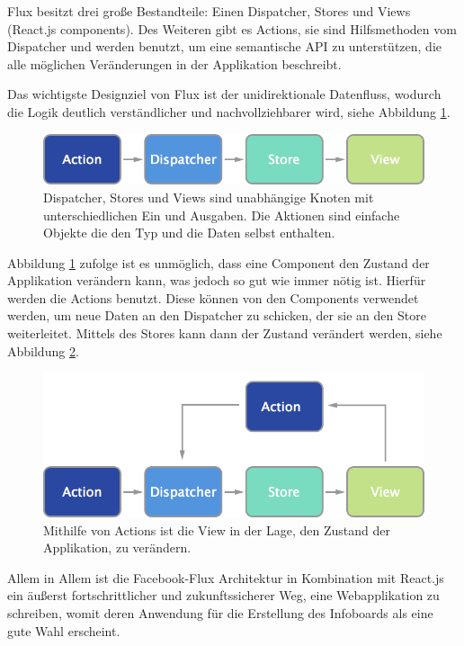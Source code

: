 \documentclass[12pt,twoside]{book}
\begin{document}
Flux besitzt drei große Bestandteile: Einen Dispatcher, Stores und Views (React.js components). Des Weiteren gibt es Actions, sie sind Hilfsmethoden vom Dispatcher und werden benutzt, um eine semantische API zu unterstützen, die alle möglichen Veränderungen in der Applikation beschreibt.

Das wichtigste Designziel von Flux ist der unidirektionale Datenfluss, wodurch die Logik deutlich verständlicher und nachvollziehbarer wird, siehe Abbildung \ref{fig:flux}.

\begin{figure}[htbp]
    \centering
    \includegraphics[width=1.0\textwidth]{images/flux.png}
    \caption{Dispatcher, Stores und Views sind unabhängige Knoten mit unterschiedlichen Ein und Ausgaben. Die Aktionen sind einfache Objekte die den Typ und die Daten selbst enthalten.}
    \label{fig:flux}
\end{figure}

Abbildung \ref{fig:flux} zufolge ist es unmöglich, dass eine Component den Zustand der Applikation verändern kann, was jedoch so gut wie immer nötig ist. Hierfür werden die Actions benutzt. Diese können von den Components verwendet werden, um neue Daten an den Dispatcher zu schicken, der sie an den Store weiterleitet. Mittels des Stores kann dann der Zustand verändert werden, siehe Abbildung \ref{fig:flux_actions}.

\begin{figure}[htbp]
    \centering
    \includegraphics[width=1.0\textwidth]{images/flux_actions.png}
    \caption{Mithilfe von Actions ist die View in der Lage, den Zustand der Applikation, zu verändern.}
    \label{fig:flux_actions}
\end{figure}

Allem in Allem ist die Facebook-Flux Architektur in Kombination mit React.js ein äußerst fortschrittlicher und zukunftssicherer Weg, eine Webapplikation zu schreiben, womit deren Anwendung für die Erstellung des Infoboards als eine gute Wahl erscheint.
\end{document}
